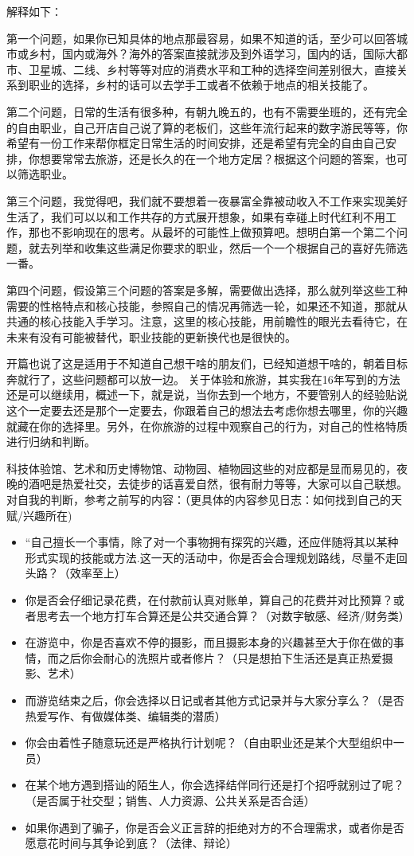 \documentclass[
]{book}
\providecommand{\tightlist}{%
  \setlength{\itemsep}{0pt}\setlength{\parskip}{0pt}}
\begin{document}
解释如下：

第一个问题，如果你已知具体的地点那最容易，如果不知道的话，至少可以回答城市或乡村，国内或海外？海外的答案直接就涉及到外语学习，国内的话，国际大都市、卫星城、二线、乡村等等对应的消费水平和工种的选择空间差别很大，直接关系到职业的选择，乡村的话可以去学手工或者不依赖于地点的相关技能了。

第二个问题，日常的生活有很多种，有朝九晚五的，也有不需要坐班的，还有完全的自由职业，自己开店自己说了算的老板们，这些年流行起来的数字游民等等，你希望有一份工作来帮你框定日常生活的时间安排，还是希望有完全的自由自己安排，你想要常常去旅游，还是长久的在一个地方定居？根据这个问题的答案，也可以筛选职业。

第三个问题，我觉得吧，我们就不要想着一夜暴富全靠被动收入不工作来实现美好生活了，我们可以以和工作共存的方式展开想象，如果有幸碰上时代红利不用工作，那也不影响现在的思考。从最坏的可能性上做预算吧。想明白第一个第二个问题，就去列举和收集这些满足你要求的职业，然后一个一个根据自己的喜好先筛选一番。

第四个问题，假设第三个问题的答案是多解，需要做出选择，那么就列举这些工种需要的性格特点和核心技能，参照自己的情况再筛选一轮，如果还不知道，那就从共通的核心技能入手学习。注意，这里的核心技能，用前瞻性的眼光去看待它，在未来有没有可能被替代，职业技能的更新换代也是很快的。

开篇也说了这是适用于不知道自己想干啥的朋友们，已经知道想干啥的，朝着目标奔就行了，这些问题都可以放一边。
关于体验和旅游，其实我在16年写到的方法还是可以继续用，概述一下，就是说，当你去到一个地方，不要管别人的经验贴说这个一定要去还是那个一定要去，你跟着自己的想法去考虑你想去哪里，你的兴趣就藏在你的选择里。另外，在你旅游的过程中观察自己的行为，对自己的性格特质进行归纳和判断。

科技体验馆、艺术和历史博物馆、动物园、植物园这些的对应都是显而易见的，夜晚的酒吧是热爱社交，去徒步的话喜爱自然，很有耐力等等，大家可以自己联想。对自我的判断，参考之前写的内容：（更具体的内容参见日志：如何找到自己的天赋/兴趣所在)

\begin{itemize}
\tightlist
\item
  ``自己擅长一个事情，除了对一个事物拥有探究的兴趣，还应伴随将其以某种形式实现的技能或方法.这一天的活动中，你是否会合理规划路线，尽量不走回头路？（效率至上）
\item
  你是否会仔细记录花费，在付款前认真对账单，算自己的花费并对比预算？或者思考去一个地方打车合算还是公共交通合算？（对数字敏感、经济/财务类）
\item
  在游览中，你是否喜欢不停的摄影，而且摄影本身的兴趣甚至大于你在做的事情，而之后你会耐心的洗照片或者修片？（只是想拍下生活还是真正热爱摄影、艺术）
\item
  而游览结束之后，你会选择以日记或者其他方式记录并与大家分享么？（是否热爱写作、有做媒体类、编辑类的潜质）
\item
  你会由着性子随意玩还是严格执行计划呢？（自由职业还是某个大型组织中一员）
\item
  在某个地方遇到搭讪的陌生人，你会选择结伴同行还是打个招呼就别过了呢？（是否属于社交型；销售、人力资源、公共关系是否合适）
\item
  如果你遇到了骗子，你是否会义正言辞的拒绝对方的不合理需求，或者你是否愿意花时间与其争论到底？（法律、辩论）
\end{itemize}
\end{document}
